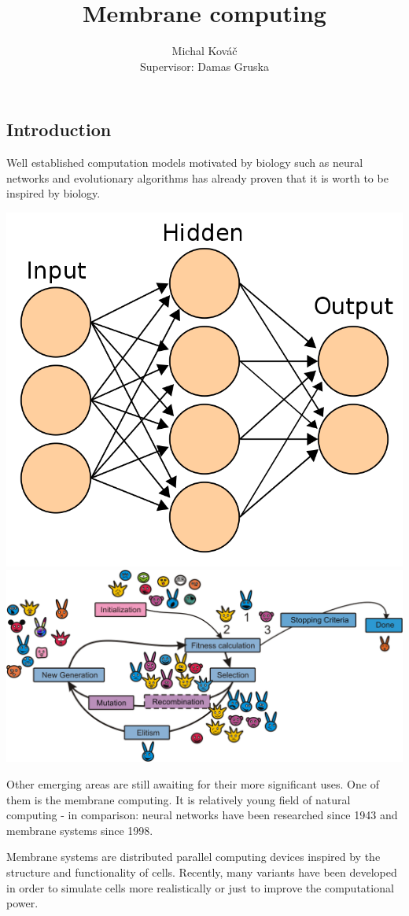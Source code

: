 \documentclass[myposter,portrait]{sciposter}
\def\mysection#1{
{\color{sectionCol}\section*{\sc\bfseries #1}}}
\begin{document}
\setlength{\logowidth}{20cm}
\setlength{\titlewidth}{\textwidth}
\addtolength{\titlewidth}{-\logowidth}
\useleftlogofalse

\color{textCol}

\title{Membrane computing}
\author{Michal Kováč\\
        Supervisor: Damas Gruska}
\maketitle

\begin{multicols*}{3}

\mysection{Introduction}


Well established computation models motivated by biology such as neural networks and evolutionary algorithms has already proven that it is worth to be inspired by biology.

\vspace{10mm}
\includegraphics[width=0.3\columnwidth]{neural}
\hspace{0.1\columnwidth}
\includegraphics[width=0.6\columnwidth]{evolution}
\vspace{10mm}

Other emerging areas are still awaiting for their more significant uses. One of them is the membrane computing. It is relatively young field of natural computing - in comparison: neural networks have been researched since 1943 and membrane systems since 1998\cite{Paun98}.

Membrane systems are distributed parallel computing devices inspired by the structure and functionality of cells. Recently, many variants have been developed in order to simulate cells more realistically or just to improve the computational power.


\end{multicols*}
\end{document}
